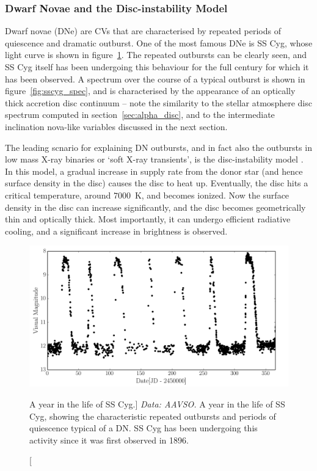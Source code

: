 \subsubsection{Dwarf Novae and the Disc-instability Model}

Dwarf novae (DNe) are CVs that are characterised 
by repeated periods of quiescence and dramatic outburst. One of the 
most famous DNe is SS Cyg, whose light curve is shown in 
figure~\ref{fig:sscyg}. The repeated outbursts can be clearly seen, and
SS Cyg itself has been undergoing this behaviour for the full century 
for which it has been observed. A spectrum over the course of a 
typical outburst is shown in figure~\ref{fig:sscyg_spec}, 
and is characterised by the appearance of an optically thick
accretion disc continuum -- note the similarity to the 
stellar atmosphere disc spectrum computed in section~\ref{sec:alpha_disc},
and to the intermediate inclination nova-like variables discussed in the next
section.

The leading scnario for explaining DN outbursts, and in fact also the outbursts
in low mass X-ray binaries or `soft X-ray transients',
is the disc-instability model 
\citep[DIM; ][]{osaki1974,lasota2001}. 
In this model, a gradual increase in supply rate from the donor star 
(and hence surface density in the disc) 
causes the disc to heat up. Eventually, the disc hits a critical temperature,
around $7000$~K, and becomes ionized. Now the surface density in the disc
can increase significantly, and the disc becomes geometrically thin and
optically thick. Most importantly, it can undergo efficient radiative
cooling, and a significant increase in brightness is observed.

\begin{figure}
\centering
\includegraphics[width=1.0\textwidth]{figures/01-intro/lc_sscyg.png}
\caption
[A year in the life of SS Cyg.]
{
{\sl Data: AAVSO.} 
A year in the life of SS Cyg, showing the characteristic repeated
outbursts and periods of quiescence typical of a DN. SS Cyg has been
undergoing this activity since it was first observed in 1896.
} 
\label{fig:sscyg}
\end{figure}

